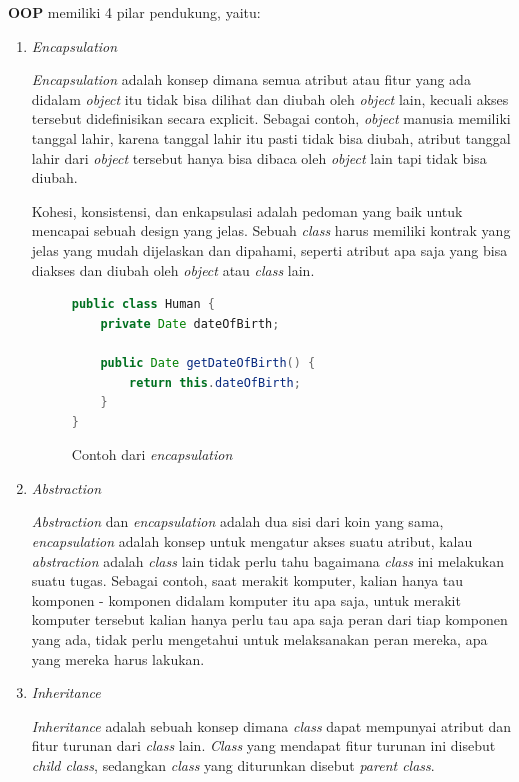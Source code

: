 \documentclass[a4paper]{article}
\begin{document}
\textbf{OOP} memiliki 4 pilar pendukung, yaitu:
\begin{enumerate}

    \item \textit{Encapsulation}

    \textit{Encapsulation} adalah konsep dimana semua atribut atau fitur yang ada didalam \textit{object} itu tidak bisa dilihat dan diubah oleh \textit{object} lain, kecuali akses tersebut didefinisikan secara explicit\autocite{education-erin-oop-2020}. Sebagai contoh, \textit{object} manusia memiliki tanggal lahir, karena tanggal lahir itu pasti tidak bisa diubah, atribut tanggal lahir dari \textit{object} tersebut hanya bisa dibaca oleh \textit{object} lain tapi tidak bisa diubah.
        
    Kohesi, konsistensi, dan enkapsulasi adalah pedoman yang baik untuk mencapai sebuah design yang jelas. Sebuah \textit{class} harus memiliki kontrak yang jelas yang mudah dijelaskan dan dipahami, seperti atribut apa saja yang bisa diakses dan diubah oleh \textit{object} atau \textit{class} lain\autocite{liang_liang_2021}.

    \begin{figure}[h]
        \centering
        \begin{lstlisting}[language=Java]
public class Human {
    private Date dateOfBirth;

    public Date getDateOfBirth() {
        return this.dateOfBirth;
    }
}\end{lstlisting}
        \caption{Contoh dari \textit{encapsulation}}
    \end{figure}

    \item \textit{Abstraction}

    \textit{Abstraction} dan \textit{encapsulation} adalah dua sisi dari koin yang sama, \textit{encapsulation} adalah konsep untuk mengatur akses suatu atribut, kalau \textit{abstraction} adalah \textit{class} lain tidak perlu tahu bagaimana \textit{class} ini melakukan suatu tugas\autocite{liang_liang_2021}. Sebagai contoh, saat merakit komputer, kalian hanya tau komponen - komponen didalam komputer itu apa saja, untuk merakit komputer tersebut kalian hanya perlu tau apa saja peran dari tiap komponen yang ada, tidak perlu mengetahui untuk melaksanakan peran mereka, apa yang mereka harus lakukan.
    \newpage
        
    \item \textit{Inheritance}

    \textit{Inheritance} adalah sebuah konsep dimana \textit{class} dapat mempunyai atribut dan fitur turunan dari \textit{class} lain. \textit{Class} yang mendapat fitur turunan ini disebut \textit{child class}, sedangkan \textit{class} yang diturunkan disebut \textit{parent class}\autocite{education-erin-oop-2020}. 


\end{enumerate}
\end{document}
